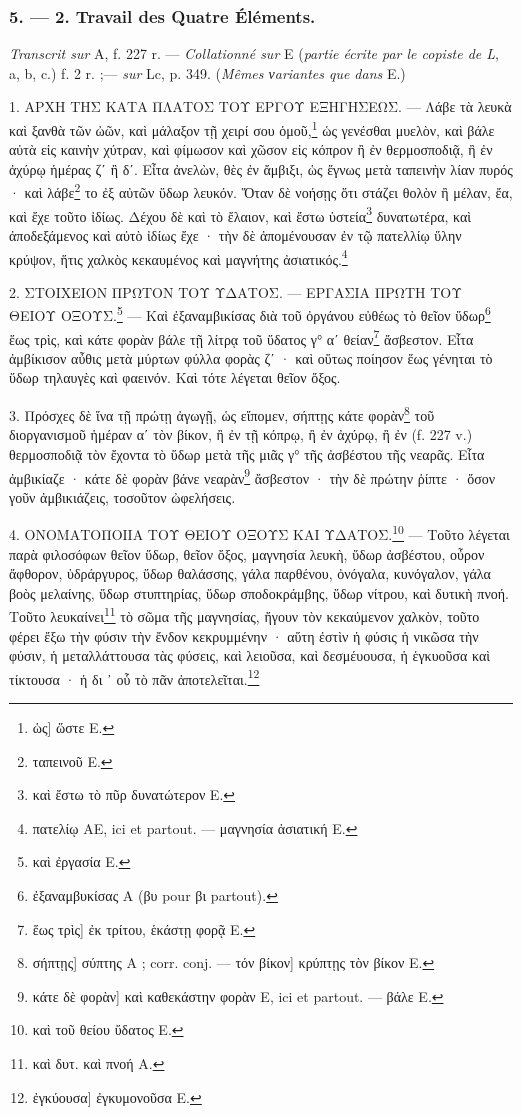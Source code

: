 \documentclass[a4paper, 11pt, oneside, polutonikogreek, french]{article}
\begin{document}
\bigskip
\centerline{\EightStarTaper}
\centerline{\EightStarTaper\EightStarTaper}
\bigskip

\subsubsection{5. --- 2. Travail des Quatre Éléments.}

\emph{Transcrit sur} A, f. 227 r. --- \emph{Collationné sur} E (\emph{partie écrite par le copiste de L}, a, b, c.) f. 2 r. ;--- \emph{sur} Lc, p. 349. (\emph{Mêmes νariantes que dans} E.)

1. ΑΡΧΗ ΤΗΣ ΚΑΤΑ ΠΛΑΤΟΣ ΤΟΥ ΕΡΓΟΥ ΕΞΗΓΗΣΕΩΣ. --- Λάβε τὰ λευκὰ καὶ ξανθὰ τῶν ὠῶν, καὶ μάλαξον τῇ χειρί σου ὁμοῦ,\footnote{ὡς] ὥστε E.} ὡς γενέσθαι μυελὸν, καὶ βάλε αὐτὰ εἰς καινὴν χύτραν, καὶ φίμωσον καὶ χῶσον εἰς κόπρον ἢ ἐν θερμοσποδιᾷ, ἢ ἐν ἀχύρῳ ἡμέρας ζʹ ἢ δʹ. Εἶτα ἀνελὼν, θὲς ἐν ἄμβιξι, ὡς ἔγνως μετὰ ταπεινὴν λίαν πυρός · καὶ λάβε\footnote{ταπεινοῦ E.} το ἐξ αὐτῶν ὕδωρ λευκόν. Ὅταν δὲ νοήσῃς ὅτι στάζει θολὸν ἢ μέλαν, ἔα, καὶ ἔχε τοῦτο ἰδίως. Δέχου δὲ καὶ τὸ ἔλαιον, καὶ ἔστω ὑστεία\footnote{καὶ ἔστω τὸ πῦρ δυνατώτερον E.} δυνατωτέρα, καὶ ἀποδεξάμενος καὶ αὐτὸ ἰδίως ἔχε · τὴν δὲ ἀπομένουσαν ἐν τῷ πατελλίῳ ὕλην κρύψον, ἥτις χαλκὸς κεκαυμένος καὶ μαγνήτης ἀσιατικός.\footnote{πατελίῳ AE, ici et partout. --- μαγνησία ἀσιατική E.}

2. ΣΤΟΙΧΕΙΟΝ ΠΡΩΤΟΝ ΤΟΥ ΥΔΑΤΟΣ. --- ΕΡΓΑΣΙΑ ΠΡΩΤΗ ΤΟΥ ΘΕΙΟΥ ΟΞΟΥΣ.\footnote{καὶ ἐργασία E.} --- Καὶ ἐξαναμβικίσας διὰ τοῦ ὀργάνου εὐθέως τὸ θεῖον ὕδωρ\footnote{ἐξαναμβυκίσας A (βυ pour βι partout).} ἕως τρὶς, καὶ κάτε φορὰν βάλε τῇ λίτρᾳ τοῦ ὕδατος γ° αʹ θείαν\footnote{ἕως τρὶς] ἐκ τρίτου, ἑκάστῃ φορᾷ E.} ἄσβεστον. Εἶτα ἀμβίκισον αὖθις μετὰ μύρτων φύλλα φορὰς ζʹ · καὶ οὕτως ποίησον ἕως γένηται τὸ ὕδωρ τηλαυγὲς καὶ φαεινόν. Καὶ τότε λέγεται θεῖον ὄξος.

3. Πρόσχες δὲ ἵνα τῇ πρώτῃ ἀγωγῇ, ὡς εἴπομεν, σήπτῃς κάτε φορὰν\footnote{σήπτῃς] σύπτης A ; corr. conj. --- τόν βίκον] κρύπτῃς τὸν βίκον E.} τοῦ διοργανισμοῦ ἡμέραν αʹ τὸν βίκον, ἢ ἐν τῇ κόπρῳ, ἢ ἐν ἀχύρῳ, ἢ ἐν (f. 227 v.) θερμοσποδιᾷ τὸν ἔχοντα τὸ ὕδωρ μετὰ τῆς μιᾶς γ° τῆς ἀσβέστου τῆς νεαρᾶς. Εἶτα ἀμβικίαζε · κάτε δὲ φορὰν βάνε νεαρὰν\footnote{κάτε δὲ φορὰν] καὶ καθεκάστην φορὰν E, ici et partout. --- βάλε E.} ἄσβεστον · τὴν δὲ πρώτην ῥίπτε · ὅσον γοῦν ἀμβικιάζεις, τοσοῦτον ὠφελήσεις.

4. ΟΝΟΜΑΤΟΠΟΙΙΑ ΤΟΥ ΘΕΙΟΥ ΟΞΟΥΣ ΚΑΙ ΥΔΑΤΟΣ.\footnote{καὶ τοῦ θείου ὕδατος E.} --- Τοῦτο λέγεται παρὰ φιλοσόφων θεῖον ὕδωρ, θεῖον ὄξος, μαγνησία λευκὴ, ὕδωρ ἀσβέστου, οὖρον ἄφθορον, ὑδράργυρος, ὕδωρ θαλάσσης, γάλα παρθένου, ὀνόγαλα, κυνόγαλον, γάλα βοὸς μελαίνης, ὕδωρ στυπτηρίας, ὕδωρ σποδοκράμβης, ὕδωρ νίτρου, καὶ δυτικὴ πνοή. Τοῦτο λευκαίνει\footnote{καὶ δυτ. καὶ πνοή A.} τὸ σῶμα τῆς μαγνησίας, ἤγουν τὸν κεκαύμενον χαλκὸν, τοῦτο φέρει ἔξω τὴν φύσιν τὴν ἔνδον κεκρυμμένην · αὕτη ἐστὶν ἡ φύσις ἡ νικῶσα τὴν φύσιν, ἡ μεταλλάττουσα τὰς φύσεις, καὶ λειοῦσα, καὶ δεσμέυουσα, ἡ ἑγκυοῦσα καὶ τίκτουσα · ἡ δι ᾽ οὗ τὸ πᾶν ἀποτελεῖται.\footnote{ἐγκύουσα] ἐγκυμονοῦσα E.}
\end{document}
